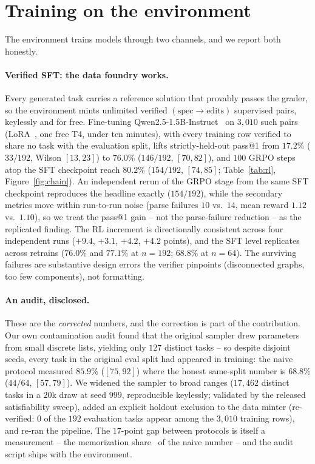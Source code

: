 \documentclass{article}
\begin{document}
\section{Training on the environment}
\label{sec:rl}
The environment trains models through two channels, and we report both honestly.

\paragraph{Verified SFT: the data foundry works.} Every generated task carries a reference solution that provably passes the grader, so the environment mints unlimited verified $(\text{spec}\!\to\!\text{edits})$ supervised pairs, keylessly and for free. Fine-tuning Qwen2.5-1.5B-Instruct~\cite{qwen25} on $3{,}010$ such pairs (LoRA~\cite{lora}, one free T4, under ten minutes), with every training row verified to share no task with the evaluation split, lifts strictly-held-out pass@1 from $17.2\%$ ($33/192$, Wilson $[13,23]$) to $76.0\%$ ($146/192$, $[70,82]$), and $100$ GRPO steps atop the SFT checkpoint reach $\mathbf{80.2\%}$ ($154/192$, $[74,85]$; Table~\ref{tab:rl}, Figure~\ref{fig:chain}). An independent rerun of the GRPO stage from the same SFT checkpoint reproduces the headline exactly ($154/192$), while the secondary metrics move within run-to-run noise (parse failures $10$ vs.\ $14$, mean reward $1.12$ vs.\ $1.10$), so we treat the pass@1 gain -- not the parse-failure reduction -- as the replicated finding. The RL increment is directionally consistent across four independent runs ($+9.4$, $+3.1$, $+4.2$, $+4.2$ points), and the SFT level replicates across retrains ($76.0\%$ and $77.1\%$ at $n{=}192$; $68.8\%$ at $n{=}64$). The surviving failures are substantive design errors the verifier pinpoints (disconnected graphs, too few components), not formatting.

\paragraph{An audit, disclosed.} These are the \emph{corrected} numbers, and the correction is part of the contribution. Our own contamination audit found that the original sampler drew parameters from small discrete lists, yielding only $127$ distinct tasks -- so despite disjoint seeds, every task in the original eval split had appeared in training: the naive protocol measured $85.9\%$ ($[75,92]$) where the honest same-split number is $68.8\%$ ($44/64$, $[57,79]$). We widened the sampler to broad ranges ($17{,}462$ distinct tasks in a $20$k draw at seed $999$, reproducible keylessly; validated by the released satisfiability sweep), added an explicit holdout exclusion to the data minter (re-verified: $0$ of the $192$ evaluation tasks appear among the $3{,}010$ training rows), and re-ran the pipeline. The $17$-point gap between protocols is itself a measurement -- the memorization share~\cite{carlini} of the naive number -- and the audit script ships with the environment.
\end{document}
